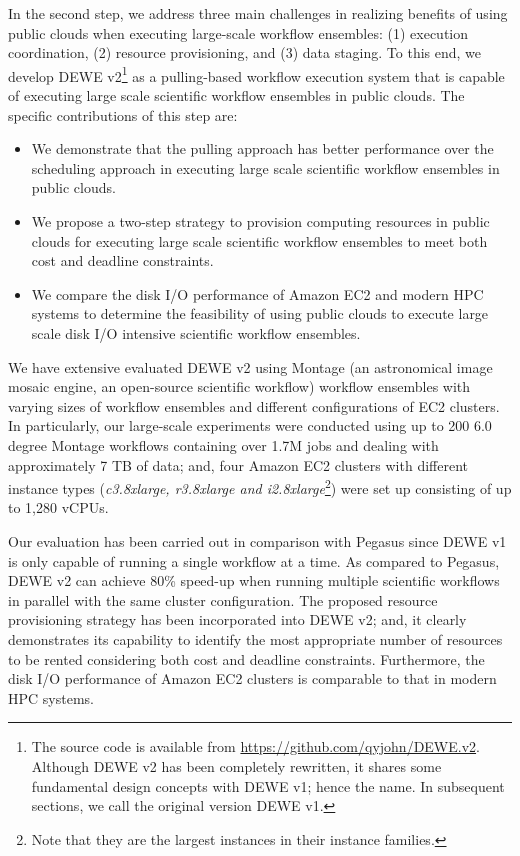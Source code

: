 In the second step, we address three main challenges in realizing benefits of using public clouds when executing large-scale workflow ensembles: (1) execution coordination, (2) resource provisioning, and (3) data staging. To this end, we develop DEWE v2\footnote{The source code is available from \url{https://github.com/qyjohn/DEWE.v2}. Although DEWE v2 has been completely rewritten, it shares some fundamental design concepts with DEWE v1; hence the name. In subsequent sections, we call the original version DEWE v1.} as a pulling-based workflow execution system that is capable of executing large scale scientific workflow ensembles in public clouds. The specific contributions of this step are:


\begin{itemize}
  \item We demonstrate that the pulling approach has better performance over the scheduling approach in executing large scale scientific workflow ensembles in public clouds. 
  \item We propose a two-step strategy to provision computing resources in public clouds for executing large scale scientific workflow ensembles to meet both cost and deadline constraints. 

\item We compare the disk I/O performance of Amazon EC2 and modern HPC systems to determine the feasibility of using public clouds to execute large scale disk I/O intensive scientific workflow ensembles.  
\end{itemize}


We have extensive evaluated DEWE v2 using Montage (an astronomical image mosaic engine, an open-source scientific workflow) workflow ensembles with varying sizes of workflow ensembles and different configurations of EC2 clusters. In particularly, our large-scale experiments were conducted using up to 200 6.0 degree Montage workflows containing over 1.7M jobs and dealing with approximately 7 TB of data; and, four Amazon EC2 clusters with different instance types (\emph{c3.8xlarge, r3.8xlarge and i2.8xlarge}\footnote{Note that they are the largest instances in their instance families.}) were set up consisting of up to 1,280 vCPUs. 

Our evaluation has been carried out in comparison with Pegasus since DEWE v1 is only capable of running a single workflow at a time. As compared to Pegasus, DEWE v2 can achieve 80\% speed-up when running multiple scientific workflows in parallel with the same cluster configuration. The proposed resource provisioning strategy has been incorporated into DEWE v2; and, it clearly demonstrates its capability to identify the most appropriate number of resources to be rented considering both cost and deadline constraints. Furthermore, the disk I/O performance of Amazon EC2 clusters is comparable to that in modern HPC systems.

